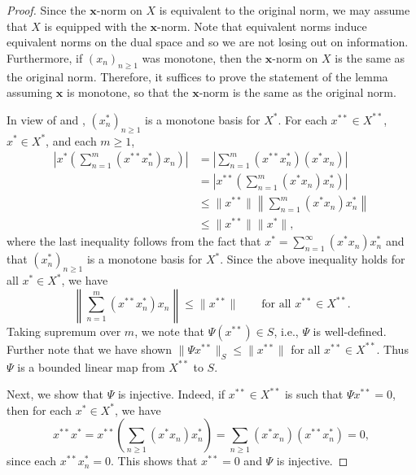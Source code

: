 \documentclass[11pt]{article}
\theoremstyle{thmstyle}
\theoremstyle{defstyle}
\renewcommand{\le}{\leqslant}
\renewcommand{\ge}{\geqslant}
\begin{document}
\begin{proof}
	Since the $\mathbf x$-norm on $X$ is equivalent to the original norm, we may assume that $X$ is equipped with the $\mathbf x$-norm. Note that equivalent norms induce equivalent norms on the dual space and so we are not losing out on information. Furthermore, if $(x_n)_{n\ge 1}$ was monotone, then the $\mathbf x$-norm on $X$ is the same as the original norm. Therefore, it suffices to prove the statement of the lemma assuming $\mathbf x$ is monotone, so that the $\mathbf x$-norm is the same as the original norm. 

	In view of  and , $(x_n^\ast)_{n\ge 1}$ is a monotone basis for $X^\ast$. For each $x^{\ast\ast}\in X^{\ast\ast}$, $x^{\ast}\in X^{\ast}$, and each $m\ge 1$, 
	\begin{align*}
		\left|x^\ast\left(\sum_{n = 1}^m (x^{\ast\ast}x_n^\ast)x_n\right)\right| &= \left|\sum_{n = 1}^m (x^{\ast\ast}x_n^\ast)(x^\ast x_n)\right|\\
		&= \left|x^{\ast\ast}\left(\sum_{n = 1}^{m}(x^\ast x_n)x_n^\ast\right)\right|\\
		&\le \|x^{\ast\ast}\|\left\|\sum_{n = 1}^m (x^\ast x_n)x_n^\ast\right\|\\
		&\le \|x^{\ast\ast}\|\|x^\ast\|,
	\end{align*}
	where the last inequality follows from the fact that $x^\ast = \displaystyle \sum_{n = 1}^\infty (x^\ast x_n)x_n^\ast$ and that $(x_n^\ast)_{n\ge 1}$ is a monotone basis for $X^\ast$. Since the above inequality holds for all $x^{\ast}\in X^\ast$, we have 
	\begin{equation*}
		\left\|\sum_{n = 1}^m (x^{\ast\ast}x_n^\ast)x_n\right\|\le \|x^{\ast\ast}\|\qquad\text{for all }x^{\ast\ast}\in X^{\ast\ast}. 
	\end{equation*}
	Taking supremum over $m$, we note that $\Psi(x^{\ast\ast})\in S$, i.e., $\Psi$ is well-defined. Further note that we have shown $\|\Psi x^{\ast\ast}\|_S\le \|x^{\ast\ast}\|$ for all $x^{\ast\ast}\in X^{\ast\ast}$. Thus $\Psi$ is a bounded linear map from $X^{\ast\ast}$ to $S$.

	Next, we show that $\Psi$ is injective. Indeed, if $x^{\ast\ast}\in X^{\ast\ast}$ is such that $\Psi x^{\ast\ast} = 0$, then for each $x^\ast\in X^\ast$, we have 
	\begin{equation*}
		x^{\ast\ast} x^{\ast} = x^{\ast\ast}\left(\sum_{n\ge 1} (x^{\ast} x_n)x_n^\ast\right) = \sum_{n\ge 1} (x^\ast x_n)(x^{\ast\ast} x_n^\ast) = 0,
	\end{equation*}
	since each $x^{\ast\ast} x_n^\ast = 0$. This shows that $x^{\ast\ast} = 0$ and $\Psi$ is injective.


\end{proof}
\end{document}
